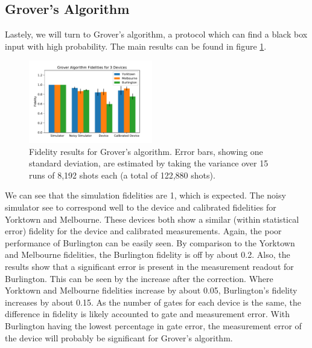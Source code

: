 \subsection{Grover's Algorithm}
Lastely, we will turn to Grover's algorithm, a protocol which can find a black box input with high probability. The main results can be found in figure \ref{fig:grover_histogram}.
\begin{figure}[h!]
	\centering
	\includegraphics[width=0.48\textwidth]{images/results/grover_histogram.pdf}
	\caption{Fidelity results for Grover's algorithm. Error bars, showing
		one standard deviation, are estimated by taking the variance over 15 runs of
		8,192 shots each (a total of 122,880 shots).}
	\label{fig:grover_histogram}
\end{figure}
We can see that the simulation fidelities are 1, which is expected. The noisy simulator see to correspond well to the device and calibrated fidelities for Yorktown and Melbourne. These devices both show a similar (within statistical error) fidelity for the device and calibrated measurements. Again, the poor performance of Burlington can be easily seen. By comparison to the Yorktown and Melbourne fidelities, the Burlington fidelity is off by about 0.2. Also, the results show that a significant error is present in the measurement readout for Burlington. This can be seen by the increase after the correction. Where Yorktown and Melbourne fidelities increase by about 0.05, Burlington's fidelity increases by about 0.15. As the number of gates for each device is the same, the difference in fidelity is likely accounted to gate and measurement error. With Burlington having the lowest percentage in gate error, the measurement error of the device will probably be significant for Grover's algorithm.

